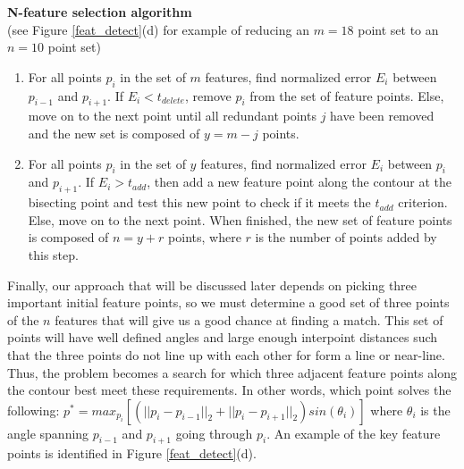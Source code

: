 \documentclass[paper=a4, fontsize=11pt]{scrartcl} %
\begin{document}
\textbf{N-feature selection algorithm}
\\
(see Figure \ref{feat_detect}(d) for example of reducing an $m = 18$ point set to an $n = 10$ point set)
\begin{enumerate}
	\item 
	For all points $p_i$ in the set of $m$ features, find normalized error $E_i$ between $p_{i-1}$ and $p_{i+1}$. If $E_i < t_{delete}$, remove $p_i$ from the set of feature points. Else, move on to the next point until all redundant points $j$ have been removed and the new set is composed of $y = m - j$ points.  
	\item
	For all points $p_i$ in the set of $y$ features, find normalized error $E_i$ between $p_{i}$ and $p_{i+1}$. If $E_i > t_{add}$, then add a new feature point along the contour at the bisecting point and test this new point to check if it meets the $t_{add}$ criterion. Else, move on to the next point. When finished, the new set of feature points is composed of $n = y + r$ points, where $r$ is the number of points added by this step. 
\end{enumerate}



Finally, our approach that will be discussed later depends on picking three important initial feature points, so we must determine a good set of three points of the $n$ features that will give us a good chance at finding a match. This set of points will have well defined angles and large enough interpoint distances such that the three points do not line up with each other for form a line or near-line. Thus, the problem becomes a search for which three adjacent feature points along the contour best meet these requirements. In other words, which point solves the following: $p^* = max_{p_i} [ (||p_i - p_{i-1}||_2 + ||p_i - p_{i+1}||_2) sin(\theta_i) ]$ where $\theta_i$ is the angle spanning $p_{i-1}$ and $p_{i+1}$ going through $p_i$. An example of the key feature points is identified in Figure \ref{feat_detect}(d). 
\end{document}
